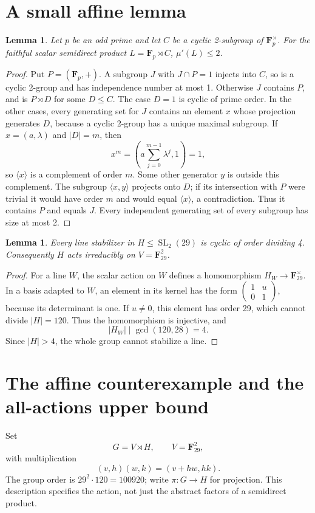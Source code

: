 \documentclass[11pt]{article}
\newtheorem{lemma}[theorem]{Lemma}
\theoremstyle{remark}\newtheorem{remark}[theorem]{Remark}
\newcommand{\F}{\mathbf F}
\newcommand{\mup}{\mu'}
\newcommand{\SL}{\operatorname{SL}}
\begin{document}
\section{A small affine lemma}
\begin{lemma}\label{lem:line}
Let $p$ be an odd prime and let $C$ be a cyclic 2-subgroup of $\F_p^\times$.
For the faithful scalar semidirect product $L=\F_p\rtimes C$,
$\mup(L)\le2$.
\end{lemma}
\begin{proof}
Put $P=(\F_p,+)$. A subgroup $J$ with $J\cap P=1$ injects into $C$, so is a
cyclic 2-group and has independence number at most 1. Otherwise $J$ contains
$P$, and is $P\rtimes D$ for some $D\le C$. The case $D=1$ is cyclic of
prime order. In the other cases, every generating set for $J$ contains an
element $x$ whose projection generates $D$, because a cyclic 2-group has a
unique maximal subgroup. If $x=(a,\lambda)$ and $|D|=m$, then
\[
 x^m=\left(a\sum_{j=0}^{m-1}\lambda^j,1\right)=1,
\]
so $\langle x\rangle$ is a complement of order $m$. Some other generator
$y$ is outside this complement. The subgroup $\langle x,y\rangle$ projects
onto $D$; if its intersection with $P$ were trivial it would have order $m$
and would equal $\langle x\rangle$, a contradiction. Thus it contains $P$
and equals $J$. Every independent generating set of every subgroup has size
at most 2.
\end{proof}

\begin{lemma}\label{lem:stabilizers}
Every line stabilizer in $H\le\SL_2(29)$ is cyclic of order dividing 4.
Consequently $H$ acts irreducibly on $V=\F_{29}^2$.
\end{lemma}
\begin{proof}
For a line $W$, the scalar action on $W$ defines a homomorphism
$H_W\to\F_{29}^\times$. In a basis adapted to $W$, an element in its kernel
has the form $\left(\begin{smallmatrix}1&u\\0&1\end{smallmatrix}\right)$,
because its determinant is one. If $u\ne0$, this element has order 29,
which cannot divide $|H|=120$. Thus the homomorphism is injective, and
\[
                 |H_W|\mid\gcd(120,28)=4.
\]
Since $|H|>4$, the whole group cannot stabilize a line.
\end{proof}

\section{The affine counterexample and the all-actions upper bound}
Set
\[
 G=V\rtimes H,\qquad V=\F_{29}^2,
\]
with multiplication
\[
              (v,h)(w,k)=(v+hw,hk).
\]
The group order is $29^2\cdot120=100920$; write $\pi:G\to H$ for projection.
This description specifies the action, not just the abstract factors of a
semidirect product.
\end{document}
